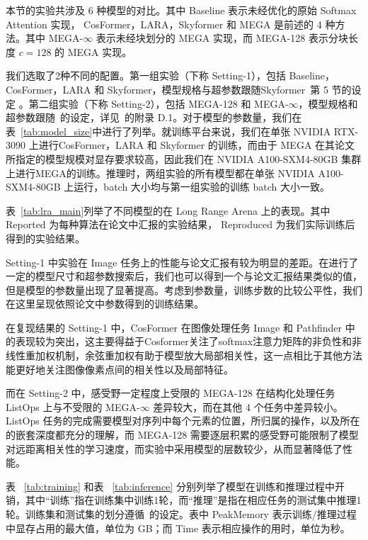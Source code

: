 

本节的实验共涉及 6 种模型的对比。其中 Baseline 表示未经优化的原始 Softmax Attention 实现， CosFormer，LARA，Skyformer 和 MEGA 是前述的 4 种方法。其中 MEGA-$\infty$ 表示未经块划分的 MEGA 实现，而 MEGA-128 表示分块长度 $c=128$ 的 MEGA 实现。

我们选取了2种不同的配置。第一组实验（下称 Setting-1），包括 Baseline，CosFormer，LARA 和 Skyformer，模型规格与超参数跟随Skyformer~\cite{chen2021skyformer}第 5 节的设定 。第二组实验（下称 Setting-2），包括 MEGA-128 和 MEGA-$\infty$，模型规格和超参数跟随~\cite{ma2023mega}的设定，详见~\cite{ma2023mega}的附录 D.1。对于模型的参数量，我们在表~\ref{tab:model_size}中进行了列举。就训练平台来说，我们在单张 NVIDIA RTX-3090 上进行CosFormer，LARA 和 Skyformer 的训练，而由于 MEGA 在其论文所指定的模型规模对显存要求较高，因此我们在 NVIDIA A100-SXM4-80GB 集群上进行MEGA的训练。推理时，两组实验的所有模型都在单张 NVIDIA A100-SXM4-80GB 上运行，batch 大小均与第一组实验的训练 batch 大小一致。


\label{subsec:lra_perf}



表~\ref{tab:lra_main}列举了不同模型的在 Long Range Arena 上的表现。其中 Reported 为每种算法在论文中汇报的实验结果， Reproduced 为我们实际训练后得到的实验结果。

Setting-1 中实验在 Image 任务上的性能与论文汇报有较为明显的差距。在进行了一定的模型尺寸和超参数搜索后，我们也可以得到一个与论文汇报结果类似的值，但是模型的参数量出现了显著提高。考虑到参数量，训练步数的比较公平性，我们在这里呈现依照论文中参数得到的训练结果。

在复现结果的 Setting-1 中，CosFormer 在图像处理任务 Image 和 Pathfinder 中的表现较为突出，这主要得益于Cosformer关注了softmax注意力矩阵的非负性和非线性重加权机制，余弦重加权有助于模型放大局部相关性，这一点相比于其他方法能更好地关注图像像素点间的相关性以及局部特征。

而在 Setting-2 中，感受野一定程度上受限的 MEGA-128 在结构化处理任务 ListOps 上与不受限的 MEGA-$\infty$ 差异较大，而在其他 4 个任务中差异较小。ListOps 任务的完成需要模型对序列中每个元素的位置，所归属的操作，以及所在的嵌套深度都充分的理解，而 MEGA-128 需要逐层积累的感受野可能限制了模型对远距离相关性的学习速度，而实验中采用模型的层数较少，从而显著降低了性能。


表 ~\ref{tab:training} 和表 ~\ref{tab:inference} 分别列举了模型在训练和推理过程中开销，其中“训练”指在训练集中训练1轮，而“推理”是指在相应任务的测试集中推理1轮。训练集和测试集的划分遵循~\cite{tay2021long}的设定。表中 PeakMemory 表示训练/推理过程中显存占用的最大值，单位为 GB；而 Time 表示相应操作的用时，单位为秒。

